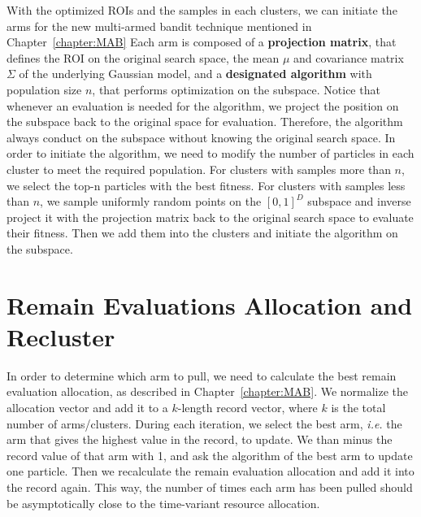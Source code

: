 With the optimized ROIs and the samples in each clusters, 
we can initiate the arms for the new multi-armed bandit technique mentioned in Chapter~\ref{chapter:MAB}
Each arm is composed of a \textbf{projection matrix}, that defines the ROI on the original search space,
the mean $\mu$ and covariance matrix $\Sigma$ of the underlying Gaussian model,
and a \textbf{designated algorithm} with population size $n$, that performs optimization on the subspace.
Notice that whenever an evaluation is needed for the algorithm, we project the position on the subspace back to the original space for evaluation.
Therefore, the algorithm always conduct on the subspace without knowing the original search space.
In order to initiate the algorithm, we need to modify the number of particles in each cluster to meet the required population.
For clusters with samples more than $n$, we select the top-n particles with the best fitness.
For clusters with samples less than $n$, we sample uniformly random points on the $[0,1]^D$ subspace and inverse project it with the projection matrix back to the original search space to evaluate their fitness.
Then we add them into the clusters and initiate the algorithm on the subspace.


\section{Remain Evaluations Allocation and Recluster}

In order to determine which arm to pull, we need to calculate the best remain evaluation allocation, as described in Chapter~\ref{chapter:MAB}.
We normalize the allocation vector and add it to a $k$-length record vector, where $k$ is the total number of arms/clusters.  
During each iteration, we select the best arm, \textit{i.e.} the arm that gives the highest value in the record, to update.
We than minus the record value of that arm with 1, and ask the algorithm of the best arm to update one particle.
Then we recalculate the remain evaluation allocation and add it into the record again.
This way, the number of times each arm has been pulled should be asymptotically close to the time-variant resource allocation.

